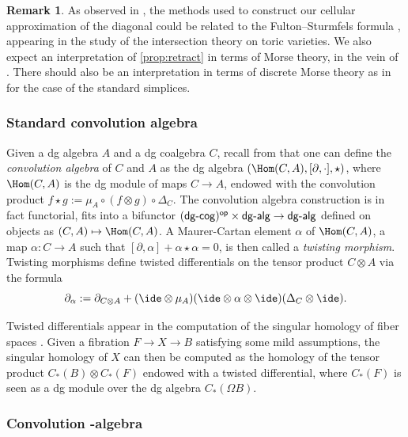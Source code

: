 \documentclass[JEP,XML,SOM,NoFloatCountersInSection,Unicode,published]{cedram}
\def\mto{\mathchoice{\longmapsto}{\mapsto}{\mapsto}{\mapsto}}
\theoremstyle{definition}
\newtheorem{remark}[definition]{\sc Remark}
\theoremstyle{plain}
\begin{document}
\begin{remark}
\label{rem:Morse}
As observed in \cite[Rem.\,1.6]{LA21}, the methods used to construct our cellular approximation of the diagonal could be related to the Fulton--Sturmfels formula \cite[Th.\,4.2]{FultonSturmfels97}, appearing in the study of the intersection theory on toric varieties.
We also expect an interpretation of \cref{prop:retract} in terms of Morse theory, in the vein of \cite{FriedmanMardonesSinha21,Frankland07}.
There should also be an interpretation in terms of discrete Morse theory as in \cite[\S 1.1.4]{Thorngren18} for the case of the standard simplices.
\end{remark}

 \label{ss:conv-ainf-alg}

\subsubsection{Standard convolution algebra}

Given a dg algebra $A$ and a dg coalgebra $C$, recall from \cite[\S 1.6]{LodayVallette12} that one can define the \textit{convolution algebra} of $C$ and $A$ as the dg algebra $(\Hom (C,A), [\partial, \cdot], \star)$, where $\Hom (C,A)$
is the dg module of maps $C \to A$, endowed with the convolution product $f \star g := \mu_A \circ (f \otimes g) \circ \Delta_C$.
The convolution algebra construction is in fact functorial, \ie fits into a bifunctor $\mathsf{(dg\textup{-}cog)^{op}} \times \mathsf{dg\textup{-}alg} \to \mathsf{dg\textup{-}alg}$ defined on objects as $(C,A) \mto \Hom (C,A)$.
A Maurer-Cartan element $\alpha$ of $\Hom (C,A)$, \ie a map $\alpha : C \to A$ such that
$[\partial, \alpha] + \alpha \star \alpha = 0$,
is then called a \emph{twisting morphism}.
Twisting morphisms define twisted differentials on the tensor product $C \otimes A$ via the formula
\[
\partial_\alpha := \partial_{C \otimes A} + (\ide \otimes \mu_A) (\ide \otimes \alpha \otimes \ide) (\Delta_C \otimes \ide).
\]

Twisted differentials appear in the computation of the singular homology of fiber spaces \cite{Brown59}.
Given a fibration $F \to X \to B$ satisfying some mild assumptions, the singular homology of $X$ can then be computed as the homology of the tensor product $C_*(B) \otimes C_*(F)$ endowed with a twisted differential, where $C_*(F)$ is seen as a dg module over the dg algebra $C_*(\Omega B)$.

\subsubsection{Convolution \Ainf -algebra} \label{sss:conv-ainf-alg}
\end{document}
